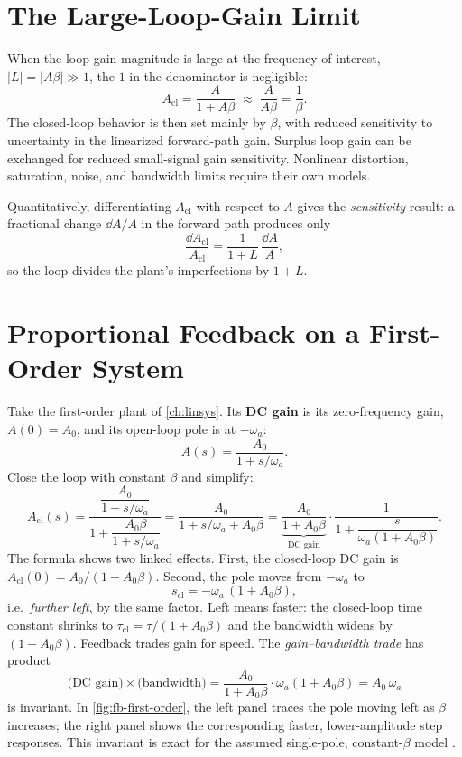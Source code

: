 \section{The Large-Loop-Gain Limit}
When the loop gain magnitude is large at the frequency of interest,
\(|L|=|A\beta|\gg1\), the \(1\) in the denominator is negligible:
\[
A_{\mathrm{cl}}=\frac{A}{1+A\beta}\;\approx\;\frac{A}{A\beta}=\frac{1}{\beta}.
\]
The closed-loop behavior is then set mainly by \(\beta\), with reduced sensitivity
to uncertainty in the linearized forward-path gain. Surplus loop gain can be
exchanged for reduced small-signal gain sensitivity. Nonlinear distortion,
saturation, noise, and bandwidth limits require their own models.

Quantitatively, differentiating \(A_{\mathrm{cl}}\) with respect to \(A\) gives the
\emph{sensitivity} result: a fractional change \(\dd A/A\) in the forward path
produces only
\[
\frac{\dd A_{\mathrm{cl}}}{A_{\mathrm{cl}}}
=\frac{1}{1+L}\,\frac{\dd A}{A},
\]
so the loop divides the plant's imperfections by \(1+L\).

\section{Proportional Feedback on a First-Order System}
Take the first-order plant of \cref{ch:linsys}. Its \textbf{DC gain} is its
zero-frequency gain, \(A(0)=A_0\), and its open-loop pole is at
\(-\omega_a\):
\[
A(s)=\frac{A_0}{1+s/\omega_a} .
\]
Close the loop with constant \(\beta\) and simplify:
\[
A_{\mathrm{cl}}(s)
=\frac{\dfrac{A_0}{1+s/\omega_a}}{1+\dfrac{A_0\beta}{1+s/\omega_a}}
=\frac{A_0}{1+s/\omega_a+A_0\beta}
=\underbrace{\frac{A_0}{1+A_0\beta}}_{\text{DC gain}}\cdot
\frac{1}{1+\dfrac{s}{\omega_a(1+A_0\beta)}} .
\]
The formula shows two linked effects. First, the closed-loop DC gain is
\(A_{\mathrm{cl}}(0)=A_0/(1+A_0\beta)\). Second, the pole moves from
\(-\omega_a\) to
\[
s_{\mathrm{cl}}=-\omega_a\,(1+A_0\beta),
\]
i.e.\ \emph{further left}, by the same factor. Left means faster: the closed-loop
time constant shrinks to \(\tau_{\mathrm{cl}}=\tau/(1+A_0\beta)\) and the bandwidth
widens by \((1+A_0\beta)\). Feedback trades gain for speed. The
\emph{gain--bandwidth trade} has product
\[
\bigl(\text{DC gain}\bigr)\times\bigl(\text{bandwidth}\bigr)
=\frac{A_0}{1+A_0\beta}\cdot\omega_a(1+A_0\beta)=A_0\,\omega_a
\]
is invariant. In \cref{fig:fb-first-order}, the left panel traces the pole moving
left as \(\beta\) increases; the right panel shows the corresponding faster,
lower-amplitude step responses. This invariant is exact for the assumed
single-pole, constant-\(\beta\) model \cite[pp.~45, 49--51]{leigh2012control}.

